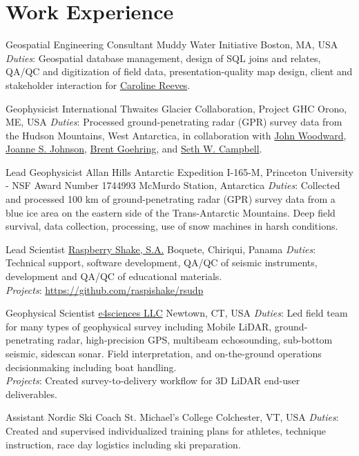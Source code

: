 \documentclass[a4paper,12pt,sans,colorlinks]{moderncv}
\newcommand{\seth}{\href{https://www.alpinesciences.net}{Seth W. Campbell}}
\newcommand{\johnwoodward}{\href{https://www.northumbria.ac.uk/about-us/our-staff/w/john-woodward}{John Woodward}}
\newcommand{\joannejohnson}{\href{https://www.bas.ac.uk/profile/jsj/}{Joanne S. Johnson}}
\newcommand{\brent}{\href{https://sse.tulane.edu/eens/faculty/goehring}{Brent Goehring}}
\newcommand{\caroline}{\href{https://www.muddywaterinitiative.org/leadership}{Caroline Reeves}}
\newcommand{\raspishake}{\href{https://raspberryshake.org}{Raspberry Shake, S.A.}}
\newcommand{\efour}{\href{https://e4sciences.com}{e4sciences LLC}}
\begin{document}
\section{Work Experience}

{Geospatial Engineering Consultant}
{Muddy Water Initiative}
{Boston, MA, USA}
{}
{
    \emph{Duties}: Geospatial database management, design of SQL joins and
    relates, QA/QC and digitization of field data, presentation-quality map
    design, client and stakeholder interaction for \caroline.
}

{Geophysicist}
{International Thwaites Glacier Collaboration, Project GHC}
{Orono, ME, USA}
{}
{
    \emph{Duties}: Processed ground-penetrating radar (GPR) survey data
    from the Hudson Mountains, West Antarctica, in collaboration with
    \johnwoodward, \joannejohnson, \brent, and \seth.
}

{Lead Geophysicist}
{Allan Hills Antarctic Expedition I-165-M,
Princeton University - NSF Award Number 1744993}
{McMurdo Station, Antarctica}
{}
{
    \emph{Duties}: Collected and processed 100 km of ground-penetrating
    radar (GPR) survey data from a blue ice area on the eastern side of the
    Trans-Antarctic Mountains. Deep field survival, data collection,
    processing, use of snow machines in harsh conditions.
}

{Lead Scientist}
{\raspishake{}}
{Boquete, Chiriqui, Panama}
{}
{
    \emph{Duties}: Technical support, software development,
    QA/QC of seismic instruments, development and QA/QC of
    educational materials.
    \\
    \emph{Projects}: \url{https://github.com/raspishake/rsudp}
}

{Geophysical Scientist}
{\efour{}}
{Newtown, CT, USA}
{}
{
    \emph{Duties}: Led field team for many types of geophysical survey
    including Mobile LiDAR, ground-penetrating radar, high-precision GPS,
    multibeam echosounding, sub-bottom seismic, sidescan sonar. Field
    interpretation, and on-the-ground operations decisionmaking including
    boat handling.
    \\
    \emph{Projects}: Created survey-to-delivery workflow for 3D LiDAR
    end-user deliverables.
}

{Assistant Nordic Ski Coach}
{St. Michael's College}
{Colchester, VT, USA}
{}
{
    \emph{Duties}: Created and supervised individualized training plans
    for athletes, technique instruction, race day logistics including
    ski preparation.
}
\end{document}
